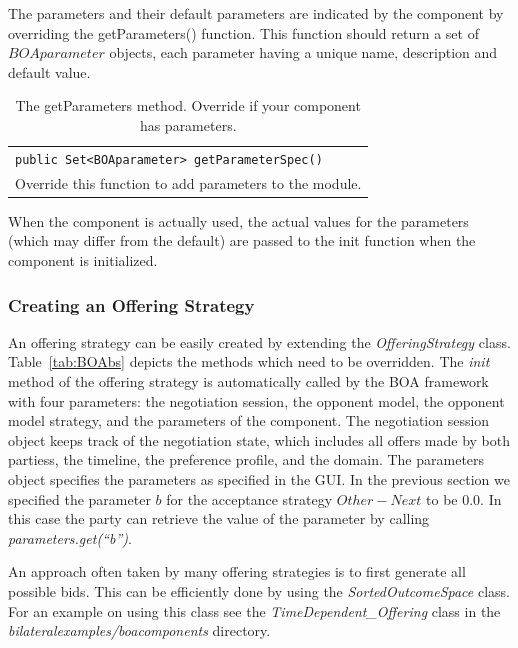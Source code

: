 \documentclass[]{llncs}
\begin{document}
The parameters and their default parameters are indicated by the component by overriding the getParameters() function. This function should return a set of $BOAparameter$ objects, each parameter having a unique name, description and default value.


\begin{table}[h]
\begin{tabular}{m{}}
\hline
\texttt{public Set<BOAparameter> getParameterSpec() }\\
 Override this function to add parameters to the module.\\
\hline
\end{tabular}
\caption{The getParameters method. Override if your component has parameters.}
\label{tab:parameters}
\end{table}


When the component is actually used, the actual values for the parameters (which may differ from the default) are passed to the init function when the component is initialized.

\subsubsection{Creating an Offering Strategy}
An offering strategy can be easily created by extending the \textit{OfferingStrategy} class. Table~\ref{tab:BOAbs} depicts the methods which need to be overridden. The \textit{init} method of the offering strategy is automatically called by the BOA framework with four parameters: the negotiation session, the opponent model, the opponent model strategy, and the parameters of the component. The negotiation session object keeps track of the negotiation state, which includes all offers made by both partiess, the timeline, the preference profile, and the domain. The parameters object specifies the parameters as specified in the GUI. In the previous section we specified the parameter $b$ for the acceptance strategy $Other - Next$ to be 0.0. In this case the party can retrieve the value of the parameter by calling \textit{parameters.get(``b'')}.

An approach often taken by many offering strategies is to first generate all possible bids. This can be efficiently done by using the \textit{SortedOutcomeSpace} class. For an example on using this class see the \textit{TimeDependent\_Offering} class in the \textit{bilateralexamples/boacomponents} directory.
\end{document}
